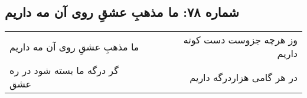 \begin{center}
\section*{شماره ۷۸: ما مذهبِ عشقِ روی آن مه داریم}
\label{sec:078}
\begin{longtable}{l p{0.5cm} r}
ما مذهبِ عشقِ روی آن مه داریم
&&
وز هرچه جزوست دست کوته داریم
\\
گر درگه ما بسته شود در ره عشق
&&
در هر گامی هزاردرگه داریم
\\
\end{longtable}
\end{center}
